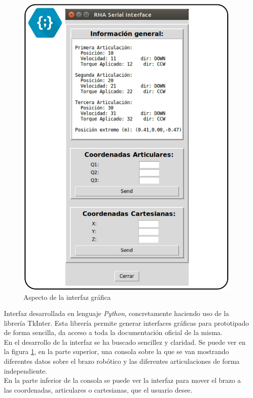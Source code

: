 	\begin{minipage}{0.48\textwidth}
	  \begin{figure}[H]
		    	\centering
		    	\includegraphics[width=1\textwidth]{figuras/Imagenes_SW/interfaz_grafica.jpg}
		    	\caption{Aspecto de la interfaz gráfica}
		    	\label{fig:SW:test:interfaz}
	  \end{figure}
	\end{minipage}
	\begin{minipage}{0.48\textwidth}
		\hspace{0.2\textwidth}
		Interfaz desarrollada en lenguaje \textit{Python}, concretamente haciendo uso de la librería TkInter. Esta librería permite generar interfaces gráficas para prototipado de forma sencilla, \cite{tkinter} da acceso a toda la documentación oficial de la misma.
		\\
		
		En el desarrollo de la interfaz se ha buscado sencillez y claridad. Se puede ver en la figura \ref{fig:SW:test:interfaz}, en la parte superior, una consola sobre la que se van mostrando diferentes datos sobre el brazo robótico y las diferentes articulaciones de forma independiente.
		\\
		
		En la parte inferior de la consola se puede ver la interfaz para mover el brazo a las coordenadas, articulares o cartesianas, que el usuario desee.
	\end{minipage}
	
